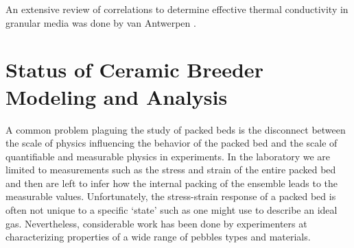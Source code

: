 An extensive review of correlations to determine effective thermal conductivity in granular media was done by van Antwerpen \etal \cite{VanAntwerpen2010}. 


%
%
\section{Status of Ceramic Breeder Modeling and Analysis}\label{sec:modeling-state}


A common problem plaguing the study of packed beds is the disconnect between the scale of physics influencing the behavior of the packed bed and the scale of quantifiable and measurable physics in experiments. In the laboratory we are limited to measurements such as the stress and strain of the entire packed bed and then are left to infer how the internal packing of the ensemble leads to the measurable values. Unfortunately, the stress-strain response of a packed bed is often not unique to a specific `state' such as one might use to describe an ideal gas. Nevertheless, considerable work has been done by experimenters at characterizing properties of a wide range of pebbles types and materials.

